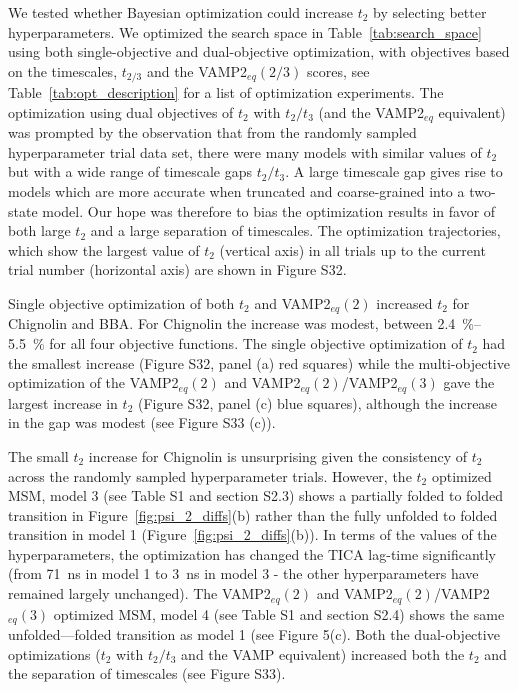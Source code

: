 \documentclass[journal=jacsat,manuscript=article]{achemso}
\begin{document}
We tested whether Bayesian optimization could increase $t_2$ by selecting better hyperparameters.  We optimized the search space in Table~\ref{tab:search_space} using both single-objective and dual-objective optimization, with objectives based on the timescales, $t_{2/3}$ and the VAMP2$_{eq}(2/3)$ scores, see Table~\ref{tab:opt_description} for a list of optimization experiments.  The optimization using dual objectives of $t_2$ with $t_2/t_3$ (and the VAMP2$_{eq}$ equivalent) was prompted by the observation that from the randomly sampled hyperparameter trial data set, there were many models with similar values of $t_2$ but with a wide range of timescale gaps $t_2/t_3$. A large timescale gap gives rise to models which are more accurate when truncated and coarse-grained into a two-state model. Our hope was therefore to bias the optimization results in favor of both large $t_2$ and a large separation of timescales. The optimization trajectories, which show the largest value of $t_2$ (vertical axis) in all trials up to the current trial number (horizontal axis) are shown in Figure S32.  

Single objective optimization of both $t_2$ and VAMP2$_{eq}(2)$ increased $t_2$ for Chignolin and BBA. For Chignolin the increase was modest, between \SIrange[range-phrase=---]{2.4}{5.5}{\percent} for all four objective functions. The single objective optimization of $t_2$ had the smallest increase (Figure S32, panel (a) red squares) while the multi-objective optimization of the VAMP2$_{eq}(2)$ and VAMP2$_{eq}(2)$/VAMP2$_{eq}(3)$ gave the largest increase in $t_2$ (Figure S32, panel (c) blue squares), although the increase in the gap was modest (see Figure S33 (c)). 
 
The small $t_2$ increase for Chignolin is unsurprising given the consistency of $t_2$ across the randomly sampled hyperparameter trials.  However, the $t_2$ optimized MSM, model 3 (see Table S1 and section S2.3) shows a partially folded to folded transition in Figure~\ref{fig:psi_2_diffs}(b) rather than the fully unfolded to folded transition in model 1 (Figure~\ref{fig:psi_2_diffs}(b)).  In terms of the values of the hyperparameters, the optimization has changed the TICA lag-time significantly (from \SI{71}{\nano\second} in model 1 to \SI{3}{\nano\second} in model 3 - the other hyperparameters have remained largely unchanged). The VAMP2$_{eq}(2)$ and VAMP2$_{eq}(2)$/VAMP2$_{eq}(3)$ optimized MSM, model 4 (see Table S1 and section S2.4) shows the same unfolded---folded transition as model 1 (see Figure 5(c). Both the dual-objective optimizations ($t_2$ with $t_2/t_3$ and the VAMP equivalent) increased both the $t_2$ and the separation of timescales (see Figure S33). 
\end{document}
